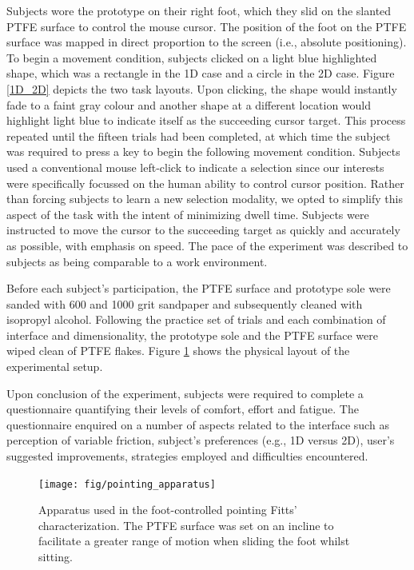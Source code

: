 \documentclass [12pt,letterpaper]{report}
\begin{document}
Subjects wore the prototype on their right foot, which they slid on the slanted PTFE surface to control the mouse cursor. The position of the foot on the PTFE surface was mapped in direct proportion to the screen (i.e., absolute positioning). To begin a movement condition, subjects clicked on a light blue highlighted shape, which was a rectangle in the 1D case and a circle in the 2D case. Figure \ref{1D_2D} depicts the two task layouts. Upon clicking, the shape would instantly fade to a faint gray colour and another shape at a different location would highlight light blue to indicate itself as the succeeding cursor target. This process repeated until the fifteen trials had been completed, at which time the subject was required to press a key to begin the following movement condition. Subjects used a conventional mouse left-click to indicate a selection since our interests were specifically focussed on the human ability to control cursor position. Rather than forcing subjects to learn a new selection modality, we opted to simplify this aspect of the task with the intent of minimizing dwell time. Subjects were instructed to move the cursor to the succeeding target as quickly and accurately as possible, with emphasis on speed. The pace of the experiment was described to subjects as being comparable to a work environment.

Before each subject's participation, the PTFE surface and prototype sole were sanded with 600 and 1000 grit sandpaper and subsequently cleaned with isopropyl alcohol. Following the practice set of trials and each combination of interface and dimensionality, the prototype sole and the PTFE surface were wiped clean of PTFE flakes. Figure \ref{pointing_apparatus} shows the physical layout of the experimental setup.

Upon conclusion of the experiment, subjects were required to complete a questionnaire quantifying their levels of comfort, effort and fatigue. The questionnaire enquired on a number of aspects related to the interface such as perception of variable friction, subject's preferences (e.g., 1D versus 2D), user's suggested improvements, strategies employed and difficulties encountered.

\begin{figure}%
  \centering
  \texttt{[image: fig/pointing\_apparatus]}
  \caption{Apparatus used in the foot-controlled pointing Fitts' characterization. The PTFE surface was set on an incline to facilitate a greater range of motion when sliding the foot whilst sitting.}
  \label{pointing_apparatus}
\end{figure}
\end{document}
